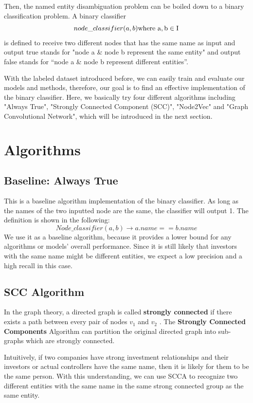 \documentclass[sigconf, nonacm]{acmart}
\begin{document}
Then, the named entity disambiguation problem can be boiled down to a binary classification problem. A binary classifier $$ node\_classifier(a,b) \rm where\ a,b \in I $$ is defined to receive two different nodes that has the same name as input and output true stands for "node a & node b represent the same entity" and output false stands for “node a & node b represent different entities”. 

With the labeled dataset introduced before, we can easily train and evaluate our models and methods, therefore, our goal is to find an effective implementation of the binary classifier. Here, we basically try four different algorithms including "Always True", "Strongly Connected Component (SCC)", "Node2Vec" and "Graph Convolutional Network", which will be introduced in the next section.

\section{Algorithms}
\subsection{Baseline: Always True}
This is a baseline algorithm implementation of the binary classifier. As long as the names of the two inputted node are the same, the classifier will output 1. The definition is shown in the following:
$$Node\_classifier(a,b) \to a.name == b.name$$
We use it as a baseline algorithm, because it provides a lower bound for any algorithms or models’ overall performance. Since it is still likely that investors with the same name might be different entities, we expect a low precision and a high recall in this case.

\subsection{SCC Algorithm}
In the graph theory, a directed graph is called \textbf{strongly connected} if there exists a path between every pair of nodes $v_1$ and $v_2$ . The \textbf{Strongly Connected Components} Algorithm can partition the original directed graph into sub-graphs
which are strongly connected.

Intuitively, if two companies have strong investment relationships and their investors or actual controllers have the same name, then it is likely for them to be the same person. With this understanding, we can use SCCA to recognize two different entities with the same name in the same strong connected group as the same entity. 
\end{document}
